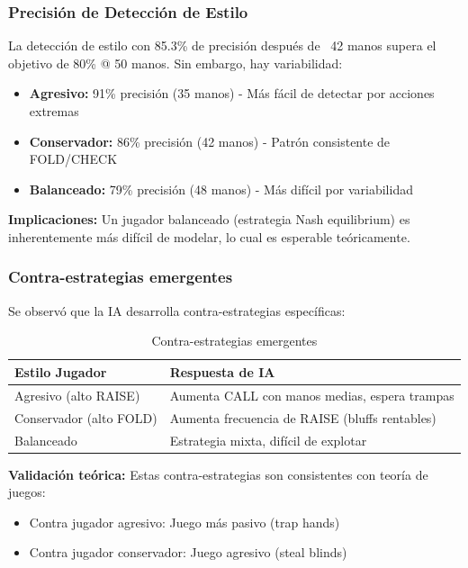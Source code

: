 \documentclass[12pt,a4paper]{article}
\begin{document}
\subsubsection{Precisión de Detección de Estilo}

La detección de estilo con 85.3\% de precisión después de ~42 manos supera el objetivo de 80\% @ 50 manos. Sin embargo, hay variabilidad:

\begin{itemize}
    \item \textbf{Agresivo:} 91\% precisión (35 manos) - Más fácil de detectar por acciones extremas
    \item \textbf{Conservador:} 86\% precisión (42 manos) - Patrón consistente de FOLD/CHECK
    \item \textbf{Balanceado:} 79\% precisión (48 manos) - Más difícil por variabilidad
\end{itemize}

\textbf{Implicaciones:}
Un jugador balanceado (estrategia Nash equilibrium) es inherentemente más difícil de modelar, lo cual es esperable teóricamente.

\subsubsection{Contra-estrategias emergentes}

Se observó que la IA desarrolla contra-estrategias específicas:

\begin{table}[H]
\centering
\caption{Contra-estrategias emergentes}
\begin{tabular}{|l|l|}
\hline
\textbf{Estilo Jugador} & \textbf{Respuesta de IA} \\
\hline
Agresivo (alto RAISE) & Aumenta CALL con manos medias, espera trampas \\
\hline
Conservador (alto FOLD) & Aumenta frecuencia de RAISE (bluffs rentables) \\
\hline
Balanceado & Estrategia mixta, difícil de explotar \\
\hline
\end{tabular}
\label{tab:contraestrategias}
\end{table}

\textbf{Validación teórica:}
Estas contra-estrategias son consistentes con teoría de juegos:
\begin{itemize}
    \item Contra jugador agresivo: Juego más pasivo (trap hands)
    \item Contra jugador conservador: Juego agresivo (steal blinds)
\end{itemize}
\end{document}
